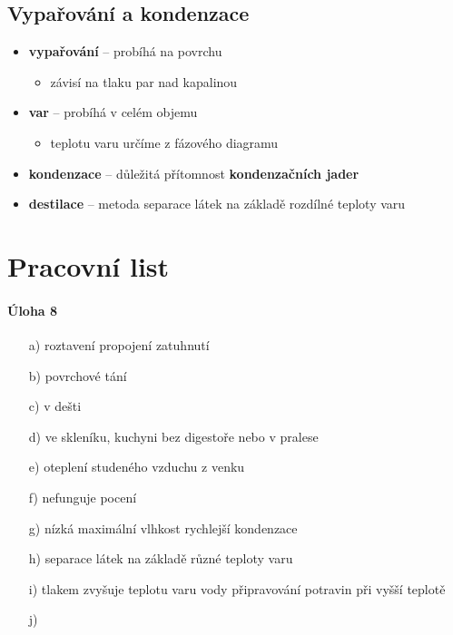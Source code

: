 \subsection{Vypařování a kondenzace}
\begin{itemize}
\item \textbf{vypařování} -- probíhá na povrchu
	\begin{itemize}
	\item závisí na tlaku par nad kapalinou
	\end{itemize}
\item \textbf{var} -- probíhá v celém objemu
	\begin{itemize}
	\item teplotu varu určíme z fázového diagramu
	\end{itemize}
\item \textbf{kondenzace} -- důležitá přítomnost \textbf{kondenzačních jader}
\item \textbf{destilace} -- metoda separace látek na základě rozdílné teploty varu
\end{itemize}

\section{Pracovní list}
\paragraph{Úloha 8}
\begin{itemize}
\item[a)] roztavení \ra propojení \ra zatuhnutí
\item[b)] povrchové tání
\item[c)] v dešti
\item[d)] ve skleníku, kuchyni bez digestoře nebo v pralese
\item[e)] oteplení studeného vzduchu z venku 
\item[f)] nefunguje pocení
\item[g)] nízká maximální vlhkost \ra rychlejší kondenzace
\item[h)] separace látek na základě různé teploty varu
\item[i)] tlakem zvyšuje teplotu varu vody \ra připravování potravin při vyšší teplotě
\item[j)] 
\end{itemize}



